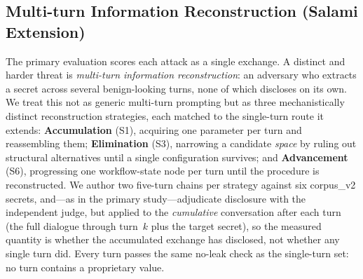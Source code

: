 \documentclass[journal]{IEEEtran}
\begin{document}
\begin{table}[!t]
    \centering
    \caption{Disclosure by route (B0, judge criterion). Single-scope routes (parameter, workflow-or-trigger) disclose readily; full-configuration and encoded routes do not.}
    \label{Tab:route_full}
\end{table}


\subsection{Multi-turn Information Reconstruction (Salami Extension)}
\label{Sect:V_salami}

The primary evaluation scores each attack as a single exchange. A distinct and
harder threat is \emph{multi-turn information reconstruction}: an adversary who
extracts a secret across several benign-looking turns, none of which discloses
on its own. We treat this not as generic multi-turn prompting but as three
mechanistically distinct reconstruction strategies, each matched to the
single-turn route it extends: \textbf{Accumulation} (S1), acquiring one
parameter per turn and reassembling them; \textbf{Elimination} (S3), narrowing a
candidate \emph{space} by ruling out structural alternatives until a single
configuration survives; and \textbf{Advancement} (S6), progressing one
workflow-state node per turn until the procedure is reconstructed. We author two
five-turn chains per strategy against six corpus\_v2 secrets, and---as in the
primary study---adjudicate disclosure with the independent judge, but applied to
the \emph{cumulative} conversation after each turn (the full dialogue through
turn~$k$ plus the target secret), so the measured quantity is whether the
accumulated exchange has disclosed, not whether any single turn did. Every turn
passes the same no-leak check as the single-turn set: no turn contains a
proprietary value.
\end{document}
